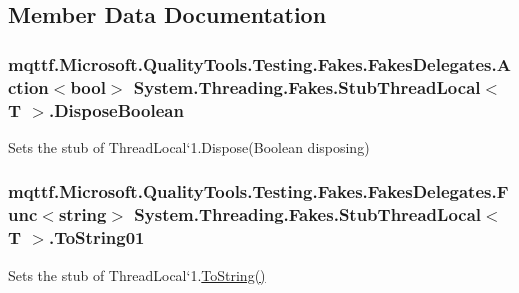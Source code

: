 \subsection{Member Data Documentation}
\hypertarget{class_system_1_1_threading_1_1_fakes_1_1_stub_thread_local_3_01_t_01_4_a0bba93f88e6f31afea819bf5f9dbe1f2}{
\subsubsection[{Dispose\-Boolean}]{\setlength{\rightskip}{0pt plus 5cm}mqttf.\-Microsoft.\-Quality\-Tools.\-Testing.\-Fakes.\-Fakes\-Delegates.\-Action$<$bool$>$ System.\-Threading.\-Fakes.\-Stub\-Thread\-Local$<$ T $>$.Dispose\-Boolean}}\label{class_system_1_1_threading_1_1_fakes_1_1_stub_thread_local_3_01_t_01_4_a0bba93f88e6f31afea819bf5f9dbe1f2}


Sets the stub of Thread\-Local`1.Dispose(\-Boolean disposing)

\hypertarget{class_system_1_1_threading_1_1_fakes_1_1_stub_thread_local_3_01_t_01_4_a9b800c2e81680323d1f13df5021743a7}{
\subsubsection[{To\-String01}]{\setlength{\rightskip}{0pt plus 5cm}mqttf.\-Microsoft.\-Quality\-Tools.\-Testing.\-Fakes.\-Fakes\-Delegates.\-Func$<$string$>$ System.\-Threading.\-Fakes.\-Stub\-Thread\-Local$<$ T $>$.To\-String01}}\label{class_system_1_1_threading_1_1_fakes_1_1_stub_thread_local_3_01_t_01_4_a9b800c2e81680323d1f13df5021743a7}


Sets the stub of Thread\-Local`1.\hyperlink{class_system_1_1_threading_1_1_fakes_1_1_stub_thread_local_3_01_t_01_4_ab08763e3a8a424b5e591eebac2ed842a}{To\-String()}



